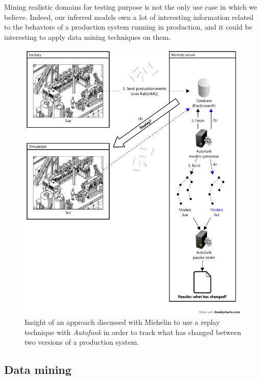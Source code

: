 Mining realistic domains for testing purpose is not the only use
case in which we believe. Indeed, our inferred models own a lot
of interesting information related to the behaviors of a
production system running in production, and it could be
interesting to apply data mining techniques on them.\\

\begin{figure}[h]
    \begin{center}
        \includegraphics[width=0.96\linewidth]{figures/autofunk_active.png}
    \end{center}

    \caption{Insight of an approach discussed with Michelin to
    use a replay technique with \textit{Autofunk} in order to
    track what has changed between two versions of a production
    system.}
    \label{fig:autofunk_active}
\end{figure}
\clearpage

\subsection{Data mining}
\label{sec:conclusion:testing:data}


